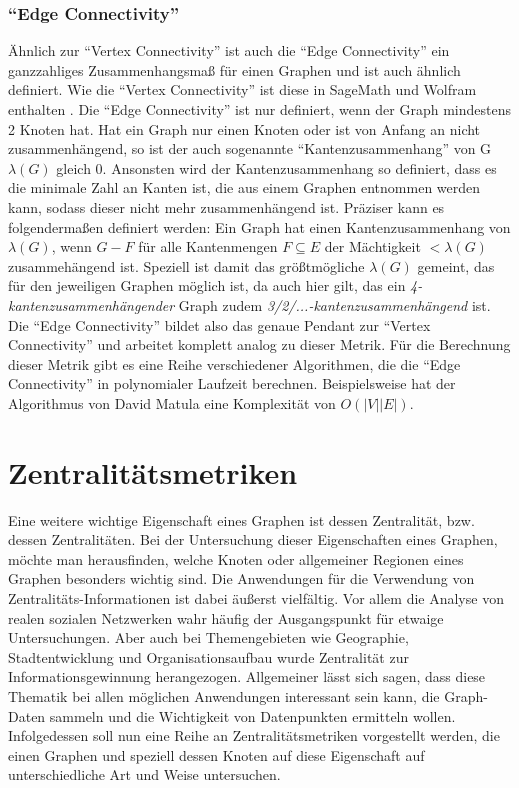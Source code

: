 \documentclass[a4paper,12pt,ngerman,chapterprefix=false,listof=totoc,bibliography=totoc]{scrreprt}
\begin{document}
\subsubsection*{"`Edge Connectivity"'}
{
Ähnlich zur "`Vertex Connectivity"' ist auch die "`Edge Connectivity"' ein ganzzahliges Zusammenhangsmaß für einen Graphen und ist auch ähnlich definiert. Wie die "`Vertex Connectivity"' ist diese in SageMath und Wolfram enthalten \cite{sagemath_graph_2020,wolfram_graph_2020}. Die "`Edge Connectivity"' ist nur definiert, wenn der Graph mindestens 2 Knoten hat. Hat ein Graph nur einen Knoten oder ist von Anfang an nicht zusammenhängend, so ist der auch sogenannte "`Kantenzusammenhang"' von G \(\lambda (G)\) gleich 0. Ansonsten wird der Kantenzusammenhang so definiert, dass es die minimale Zahl an Kanten ist, die aus einem Graphen entnommen werden kann, sodass dieser nicht mehr zusammenhängend ist. Präziser kann es folgendermaßen definiert werden: Ein Graph hat einen Kantenzusammenhang von \(\lambda (G)\), wenn \(G - F\) für alle Kantenmengen \(F\subseteq E\) der Mächtigkeit \(< \lambda (G)\) zusammehängend ist. Speziell ist damit das größtmögliche \(\lambda (G)\) gemeint, das für den jeweiligen Graphen möglich ist, da auch hier gilt, das ein \textit{4-kantenzusammenhängender} Graph zudem \textit{3/2/...-kantenzusammenhängend} ist. \cite{diestel_graphentheorie_2000} Die "`Edge Connectivity"' bildet also das genaue Pendant zur "`Vertex Connectivity"' und arbeitet komplett analog zu dieser Metrik. Für die Berechnung dieser Metrik gibt es eine Reihe verschiedener Algorithmen, die die "`Edge Connectivity"' in polynomialer Laufzeit berechnen. Beispielsweise hat der Algorithmus von David Matula eine Komplexität von \(O(|V||E|)\). \cite{matula_determining_1987}
}
\section{Zentralitätsmetriken}
{
Eine weitere wichtige Eigenschaft eines Graphen ist dessen Zentralität, bzw. dessen Zentralitäten. Bei der Untersuchung dieser Eigenschaften eines Graphen, möchte man herausfinden, welche Knoten oder allgemeiner Regionen eines Graphen besonders wichtig sind. Die Anwendungen für die Verwendung von Zentralitäts-Informationen ist dabei äußerst vielfältig. Vor allem die Analyse von realen sozialen Netzwerken wahr häufig der Ausgangspunkt für etwaige Untersuchungen. Aber auch bei Themengebieten wie Geographie, Stadtentwicklung und Organisationsaufbau wurde Zentralität zur Informationsgewinnung herangezogen. Allgemeiner lässt sich sagen, dass diese Thematik bei allen möglichen Anwendungen interessant sein kann, die Graph-Daten sammeln und die Wichtigkeit von Datenpunkten ermitteln wollen. Infolgedessen soll nun eine Reihe an Zentralitätsmetriken vorgestellt werden, die einen Graphen und speziell dessen Knoten auf diese Eigenschaft auf unterschiedliche Art und Weise untersuchen. \cite{freeman_centrality_1978}
}
\end{document}
